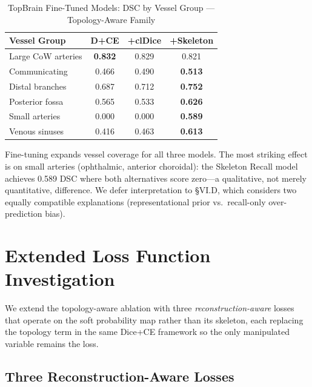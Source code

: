 \documentclass[conference]{IEEEtran}
\begin{document}
\begin{table}[t]
\centering
\caption{TopBrain Fine-Tuned Models: DSC by Vessel Group --- Topology-Aware Family}
\label{tab:topbrain}
\begin{tabular}{lccc}
\toprule
\textbf{Vessel Group} & \textbf{D+CE} & \textbf{+clDice} & \textbf{+Skeleton} \\
\midrule
Large CoW arteries & \textbf{0.832} & 0.829 & 0.821 \\
Communicating      & 0.466 & 0.490 & \textbf{0.513} \\
Distal branches    & 0.687 & 0.712 & \textbf{0.752} \\
Posterior fossa    & 0.565 & 0.533 & \textbf{0.626} \\
Small arteries     & 0.000 & 0.000 & \textbf{0.589} \\
Venous sinuses     & 0.416 & 0.463 & \textbf{0.613} \\
\bottomrule
\end{tabular}
\end{table}

Fine-tuning expands vessel coverage for all three models. The most striking effect is on small arteries (ophthalmic, anterior choroidal): the Skeleton Recall model achieves 0.589 DSC where both alternatives score zero---a qualitative, not merely quantitative, difference. We defer interpretation to §VI.D, which considers two equally compatible explanations (representational prior vs.\ recall-only over-prediction bias).

\section{Extended Loss Function Investigation}
\label{sec:extended_losses}

We extend the topology-aware ablation with three \emph{reconstruction-aware} losses that operate on the soft probability map rather than its skeleton, each replacing the topology term in the same Dice+CE framework so the only manipulated variable remains the loss.

\subsection{Three Reconstruction-Aware Losses}
\end{document}
